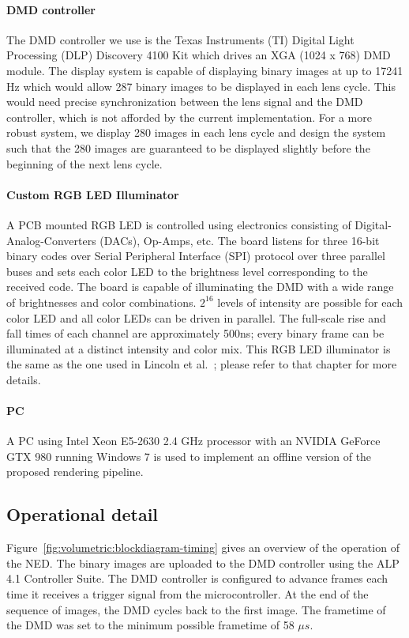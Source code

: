 \paragraph{DMD controller} 
The DMD controller we use is the Texas Instruments (TI) Digital Light Processing (DLP) Discovery 4100 Kit which drives an XGA (1024 x 768) DMD module. The display system is capable of displaying binary images at up to 17241 Hz which would allow 287 binary images to be displayed in each lens cycle. This would need precise synchronization between the lens signal and the DMD controller, which is not afforded by the current implementation. For a more robust system, we display 280 images in each lens cycle and design the system such that the 280 images are guaranteed to be displayed slightly before the beginning of the next lens cycle. 

\paragraph{Custom RGB LED Illuminator}
A PCB mounted RGB LED is controlled using electronics consisting of Digital-Analog-Converters (DACs), Op-Amps, etc. The board listens for three 16-bit binary codes over Serial Peripheral Interface (SPI) protocol over three parallel buses and sets each color LED to the brightness level corresponding to the received code. The board is capable of illuminating the DMD with a wide range of brightnesses and color combinations. $2^{16}$ levels of intensity are possible for each color LED and all color LEDs can be driven in parallel. The full-scale rise and fall times of each channel are approximately 500ns; every binary frame can be illuminated at a distinct intensity and color mix. This RGB LED illuminator is the same as the one used in Lincoln et al.~\cite{Lincoln2017scene}; please refer to that chapter for more details. 

\paragraph{PC}
A PC using Intel Xeon E5-2630 2.4 GHz processor with an NVIDIA GeForce GTX 980 running Windows 7 is used to implement an offline version of the proposed rendering pipeline. 



\subsection{Operational detail}
Figure~\ref{fig:volumetric:blockdiagram-timing} gives an overview of the operation of the NED. The binary images are uploaded to the DMD controller using the ALP 4.1 Controller Suite. The DMD controller is configured to advance frames each time it receives a trigger signal from the microcontroller. At the end of the sequence of images, the DMD cycles back to the first image. The frametime of the DMD was set to the minimum possible frametime of 58 $\mu s$.

